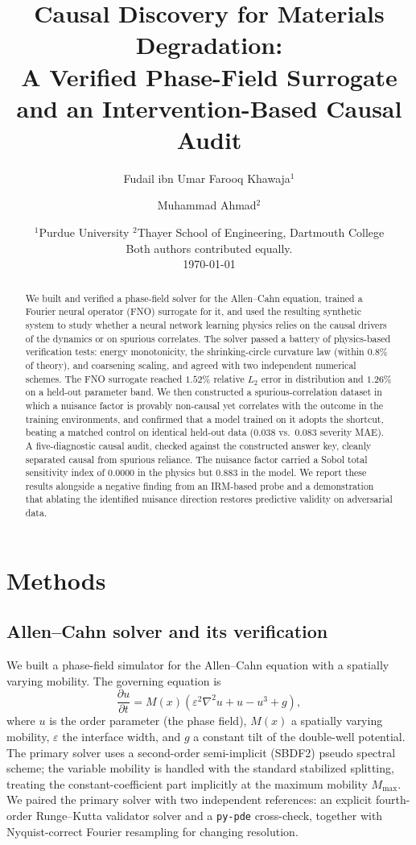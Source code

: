 \documentclass[11pt]{article}
\title{Causal Discovery for Materials Degradation:\\[0.35em]
\large A Verified Phase-Field Surrogate and an Intervention-Based Causal Audit}
\author{Fudail ibn Umar Farooq Khawaja$^{1}$ \and Muhammad Ahmad$^{2}$}
\date{%
  $^{1}$Purdue University \qquad
  $^{2}$Thayer School of Engineering, Dartmouth College\\[0.6em]
  Both authors contributed equally.\\[0.6em]
  \today
}
\begin{document}
\maketitle

\begin{abstract}
We built and verified a phase-field solver for the Allen--Cahn equation, trained a Fourier
neural operator (FNO) surrogate for it, and used the resulting synthetic system to study whether
a neural network learning physics relies on the causal drivers of the dynamics or on spurious
correlates. The solver passed a battery of physics-based verification tests: energy monotonicity,
the shrinking-circle curvature law (within $0.8\%$ of theory), and coarsening scaling, and agreed
with two independent numerical schemes. The FNO surrogate reached $1.52\%$ relative $L_2$ error
in distribution and $1.26\%$ on a held-out parameter band. We then constructed a
spurious-correlation dataset in which a nuisance factor is provably non-causal yet correlates with
the outcome in the training environments, and confirmed that a model trained on it adopts the
shortcut, beating a matched control on identical held-out data ($0.038$ vs.\ $0.083$ severity MAE).
A five-diagnostic causal audit, checked against the constructed answer key, cleanly separated
causal from spurious reliance. The nuisance factor carried a Sobol total
sensitivity index of $0.0000$ in the physics but $0.883$ in the model. We report these results
alongside a negative finding from an IRM-based probe and a demonstration that ablating the
identified nuisance direction restores predictive validity on adversarial data.
\end{abstract}

\section{Methods}

\subsection{Allen--Cahn solver and its verification}

We built a phase-field simulator for the Allen--Cahn equation with a spatially varying mobility.
The governing equation is
\begin{equation}
\frac{\partial u}{\partial t} = M(x)\left(\varepsilon^{2}\nabla^{2}u + u - u^{3} + g\right),
\label{eq:allen-cahn}
\end{equation}
where $u$ is the order parameter (the phase field), $M(x)$ a spatially varying mobility,
$\varepsilon$ the interface width, and $g$ a constant tilt of the double-well potential. The
primary solver uses a second-order semi-implicit (SBDF2) pseudo spectral scheme; the variable
mobility is handled with the standard stabilized splitting, treating the constant-coefficient part
implicitly at the maximum mobility $M_{\max}$. We paired the primary solver with two independent
references: an explicit fourth-order Runge--Kutta validator solver and a \texttt{py-pde}
cross-check, together with Nyquist-correct Fourier resampling for changing resolution.
\end{document}
